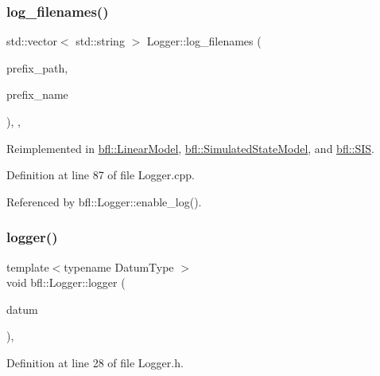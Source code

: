 \subsubsection{\texorpdfstring{log\+\_\+filenames()}{log\_filenames()}}
{\footnotesize\ttfamily std\+::vector$<$ std\+::string $>$ Logger\+::log\+\_\+filenames (\begin{DoxyParamCaption}\item[{const std\+::string \&}]{prefix\+\_\+path,  }\item[{const std\+::string \&}]{prefix\+\_\+name }\end{DoxyParamCaption})\hspace{0.3cm}{\ttfamily [protected]}, {\ttfamily [virtual]}, {\ttfamily [inherited]}}



Reimplemented in \mbox{\hyperlink{classbfl_1_1LinearModel_a8b8f645a7b7d8ebbb02c8958428fcf10}{bfl\+::\+Linear\+Model}}, \mbox{\hyperlink{classbfl_1_1SimulatedStateModel_ab4212871b8ca425855ec351c13dc3052}{bfl\+::\+Simulated\+State\+Model}}, and \mbox{\hyperlink{classbfl_1_1SIS_a805aef60946bfcaae4f65473dc7bd5ae}{bfl\+::\+S\+IS}}.



Definition at line 87 of file Logger.\+cpp.



Referenced by bfl\+::\+Logger\+::enable\+\_\+log().

\mbox{\label{classbfl_1_1Logger_a1033ff31398484f2132f84fd140da9e3}} 
\subsubsection{\texorpdfstring{logger()}{logger()}\hspace{0.1cm}{\footnotesize\ttfamily [1/4]}}
{\footnotesize\ttfamily template$<$typename Datum\+Type $>$ \\
void bfl\+::\+Logger\+::logger (\begin{DoxyParamCaption}\item[{Datum\+Type}]{datum }\end{DoxyParamCaption})\hspace{0.3cm}{\ttfamily [inline]}, {\ttfamily [inherited]}}



Definition at line 28 of file Logger.\+h.



